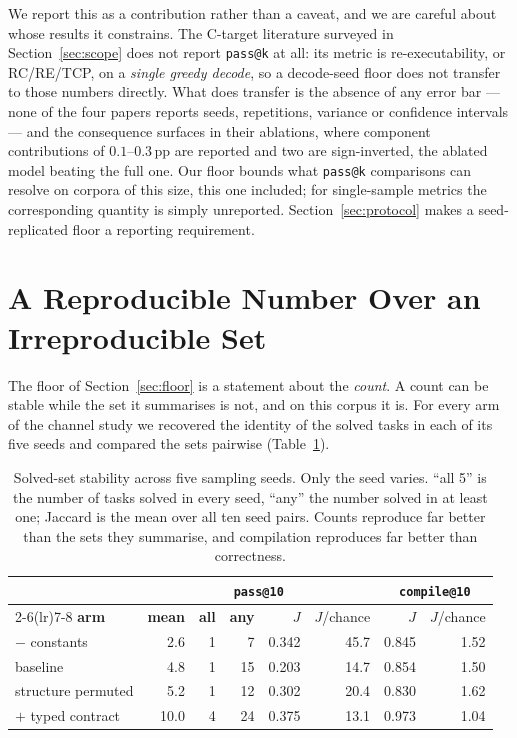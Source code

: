 \documentclass[conference]{IEEEtran}
\makeatletter
\newcommand{\passatk}{\texttt{pass@k}\xspace}
\newcommand{\passat}[1]{\texttt{pass@#1}\xspace}
\newcommand{\compileat}[1]{\texttt{compile@#1}\xspace}
\newcommand{\pp}{\,pp\xspace}
\makeatother
\begin{document}
We report this as a contribution rather than a caveat, and we are careful about
whose results it constrains. The C-target literature surveyed in
Section~\ref{sec:scope} does not report \passatk at all: its metric is
re-executability, or RC/RE/TCP, on a \emph{single greedy decode}, so a decode-seed
floor does not transfer to those numbers directly. What does transfer is the
absence of any error bar --- none of the four papers reports seeds, repetitions,
variance or confidence intervals --- and the consequence surfaces in their
ablations, where component contributions of $0.1$--$0.3$\pp are reported and two
are sign-inverted, the ablated model beating the full one. Our floor bounds what
\passatk comparisons can resolve on corpora of this size, this one included; for
single-sample metrics the corresponding quantity is simply unreported.
Section~\ref{sec:protocol} makes a seed-replicated floor a reporting requirement.

\section{A Reproducible Number Over an Irreproducible Set}
\label{sec:turnover}
The floor of Section~\ref{sec:floor} is a statement about the \emph{count}. A
count can be stable while the set it summarises is not, and on this corpus it is.
For every arm of the channel study we recovered the identity of the solved tasks
in each of its five seeds and compared the sets pairwise
(Table~\ref{tab:turnover}).

\begin{table}[t]
\caption{Solved-set stability across five sampling seeds. Only the seed varies.
``all 5'' is the number of tasks solved in every seed, ``any'' the number solved
in at least one; Jaccard is the mean over all ten seed pairs. Counts reproduce
far better than the sets they summarise, and compilation reproduces far better
than correctness.}
\label{tab:turnover}
\centering
\scriptsize
\setlength{\tabcolsep}{3.5pt}
\begin{tabular}{@{}lrrrrrrr@{}}
\toprule
 & \multicolumn{5}{c}{\passat{10}} & \multicolumn{2}{c}{\compileat{10}} \\
\cmidrule(lr){2-6}\cmidrule(lr){7-8}
\textbf{arm} & \textbf{mean} & \textbf{all} & \textbf{any} & $J$ & $J$/chance & $J$ & $J$/chance\\
\midrule
$-$ constants      & 2.6  & 1 & 7  & 0.342 & 45.7 & 0.845 & 1.52\\
baseline           & 4.8  & 1 & 15 & 0.203 & 14.7 & 0.854 & 1.50\\
structure permuted & 5.2  & 1 & 12 & 0.302 & 20.4 & 0.830 & 1.62\\
$+$ typed contract & 10.0 & 4 & 24 & 0.375 & 13.1 & 0.973 & 1.04\\
\bottomrule
\end{tabular}
\end{table}
\end{document}
